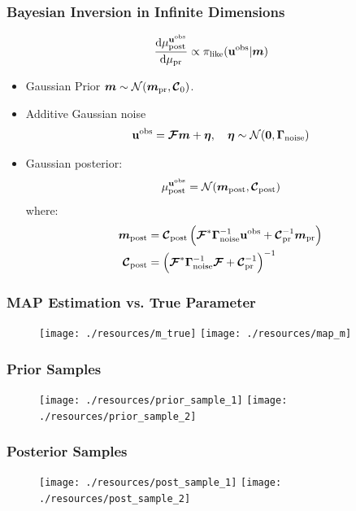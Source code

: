 \documentclass[
  pdf,
  10pt,
  xcolor={svgnames},
]{beamer}
\newcommand{\mc}[1]{\mathcal{#1}}
\newcommand{\mcb}[1]{\boldsymbol{\mathcal{#1}}}
\renewcommand{\vec}[1]{{\mathchoice
                     {\mbox{\boldmath$\displaystyle{#1}$}}
                     {\mbox{\boldmath$\textstyle{#1}$}}
                     {\mbox{\boldmath$\scriptstyle{#1}$}}
                     {\mbox{\boldmath$\scriptscriptstyle{#1}$}}}}
\newcommand{\mat}[1]{\mathbf{{#1}}}
\newcommand{\obs}{\mathbf{u}^{\rm obs}}
\begin{document}
\begin{frame}
  \frametitle{Bayesian Inversion in Infinite Dimensions}
  \begin{theorem}
    \[
      \dv{\mu^{\obs}_{\rm post}}{\mu_{\rm pr}}
      \propto
      \pi_{\rm like}(\obs | \vec{m})
    \]
  \end{theorem}
  \begin{itemize}
    \item Gaussian Prior $\vec{m} \sim \mc{N}(\vec{m}_{\rm pr}, \mcb{C}_0)$.
    \item Additive Gaussian noise
          \[
            \obs = \mcb{F} \vec{m} + \vb*{\eta},
            \quad \vb*{\eta} \sim \mc{N}(\vb{0}, \mat{\Gamma}_{\rm noise})
          \]
    \item Gaussian posterior:
          \[
            \mu^{\obs}_{\rm post}
            =
            \mc{N}(\vec{m}_{\rm post} , \mcb{C}_{\rm post})
          \]
          where:
          \begin{align*}
            \vec{m}_{\rm post}
             & =
            \mcb{C}_{\rm post}
            \left(
            \mcb{F}^* \vb{\Gamma}_{\rm noise}^{-1} \obs
            + \mcb{C}_{\rm pr}^{-1} \vec{m}_{\rm pr}
            \right)      \\
            \mcb{C}_{\rm post}
             & =
            \left(
            \mcb{F}^* \vb{\Gamma}_{\rm noise}^{-1} \mcb{F}
            + \mcb{C}_{\rm pr}^{-1}
            \right)^{-1} \\
          \end{align*}
  \end{itemize} \vspace{-1em}
\end{frame}

\begin{frame}
  \frametitle{MAP Estimation vs. True Parameter}
  \begin{figure}
    \centering
    \texttt{[image: ./resources/m\_true]}
    \texttt{[image: ./resources/map\_m]}
  \end{figure}
\end{frame}
\begin{frame}
  \frametitle{Prior Samples}
  \begin{figure}
    \centering
    \texttt{[image: ./resources/prior\_sample\_1]}
    \texttt{[image: ./resources/prior\_sample\_2]}
  \end{figure}
\end{frame}
\begin{frame}
  \frametitle{Posterior Samples}
  \begin{figure}
    \centering
    \texttt{[image: ./resources/post\_sample\_1]}
    \texttt{[image: ./resources/post\_sample\_2]}
  \end{figure}
\end{frame}
\end{document}
